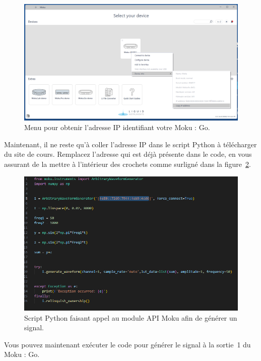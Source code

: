 \documentclass[canadien,12pt,oneside,letterpaper]{article}
\begin{document}
\begin{figure}[h]
\centering
    \includegraphics[scale=0.35]{MokuTuto3.png}
    \caption{Menu pour obtenir l'adresse IP identifiant votre Moku : Go.}
    \label{fig:MokuIP}
\end{figure}

Maintenant, il ne reste qu'à coller l'adresse IP dans le script Python à télécharger du site de cours. Remplacez l'adresse qui est déjà présente dans le code, en vous assurant de la mettre à l'intérieur des crochets comme surligné dans la figure~\ref{fig:MokuScript}.

\begin{figure}[h]
\centering
    \includegraphics[scale=0.6]{MokuTuto4.png}
    \caption{Script Python faisant appel au module API Moku afin de générer un signal.}
    \label{fig:MokuScript}
\end{figure}

Vous pouvez maintenant exécuter le code pour générer le signal à la sortie~1 du Moku : Go.
\end{document}
